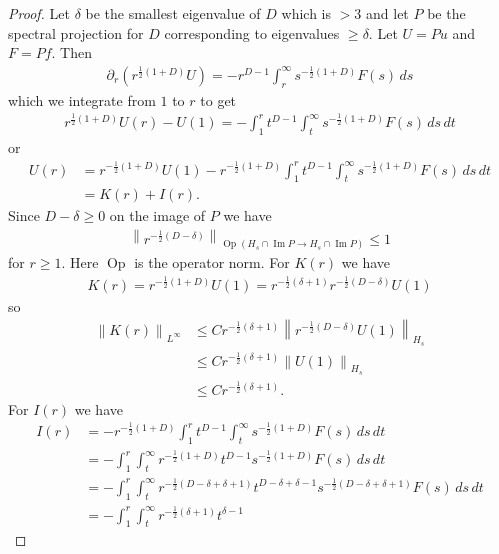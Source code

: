 \documentclass[a4paper,11pt,reqno]{amsart}
\theoremstyle{plain}
\numberwithin{equation}{section}
\begin{document}
\begin{proof}
Let $\delta$ be the smallest eigenvalue of $D$ which is $> 3$ and 
let $P$ be the spectral projection for $D$ corresponding to eigenvalues $\geq \delta$. Let $U = P u$ and $F = P f$. Then
\begin{align}
\partial_r \left( r^{\frac{1}{2}(1+D)} U \right)
= - r^{D-1} \int_r^\infty s^{-\frac{1}{2}(1+D)} F(s) \, ds 
\end{align}
which we integrate from $1$ to $r$ to get
\begin{align}
r^{\frac{1}{2}(1+D)} U(r) - U(1)
= - 
\int_1^r
t^{D-1} \int_t^\infty s^{-\frac{1}{2}(1+D)} F(s) \, ds 
\, dt
\end{align}
or
\begin{align}
U(r) 
&= r^{- \frac{1}{2}(1+D)}  U(1) 
-  r^{-\frac{1}{2}(1+D)} \int_1^r
t^{D-1} \int_t^\infty s^{-\frac{1}{2}(1+D)} F(s) \, ds 
\, dt \\
&= K(r) + I(r).
\end{align}
Since $D - \delta \geq 0$ on the image of $P$ we have
\begin{align}
\left\| r^{-\frac{1}{2} (D - \delta) }
\right\|_{\operatorname{Op}(H_s \cap \operatorname{Im}P
\to H_s \cap \operatorname{Im}P)}
\leq 1
\end{align}
for $r \geq 1$. Here $\operatorname{Op}$ is the operator norm. For $K(r)$ we have 
\begin{align}
K(r) 
= 
r^{- \frac{1}{2}(1+D)}  U(1)  
=
r^{- \frac{1}{2}(\delta + 1)} r^{- \frac{1}{2}(D - \delta)}  U(1)
\end{align}
so
\begin{align}
\left\| K(r) \right\|_{L^\infty} 
&\leq 
C r^{- \frac{1}{2}(\delta + 1)}  
\left\| r^{- \frac{1}{2}(D - \delta)}  U(1) \right\|_{H_s} \\
&\leq 
C r^{- \frac{1}{2}(\delta + 1)}
\left\| U(1) \right\|_{H_s} \\
&\leq
C r^{- \frac{1}{2}(\delta + 1)}.
\end{align}
For $I(r)$ we have
\begin{align}
I(r)
&=
-r^{-\frac{1}{2}(1+D)} \int_1^r
t^{D-1} \int_t^\infty s^{-\frac{1}{2}(1+D)} F(s) \, ds \, dt \\
&= 
- \int_1^r \int_t^\infty 
r^{-\frac{1}{2}(1+D)}
t^{D-1}
s^{-\frac{1}{2}(1+D)} F(s) \, ds \, dt \\
&=
- \int_1^r \int_t^\infty 
r^{-\frac{1}{2}(D -\delta + \delta +1)}
t^{D-\delta + \delta-1}
s^{-\frac{1}{2}(D-\delta + \delta+1)} F(s) 
\, ds \, dt \\
&=
- \int_1^r \int_t^\infty 
r^{-\frac{1}{2}(\delta +1)}
t^{\delta-1}

\end{align}
\end{proof}
\end{document}
